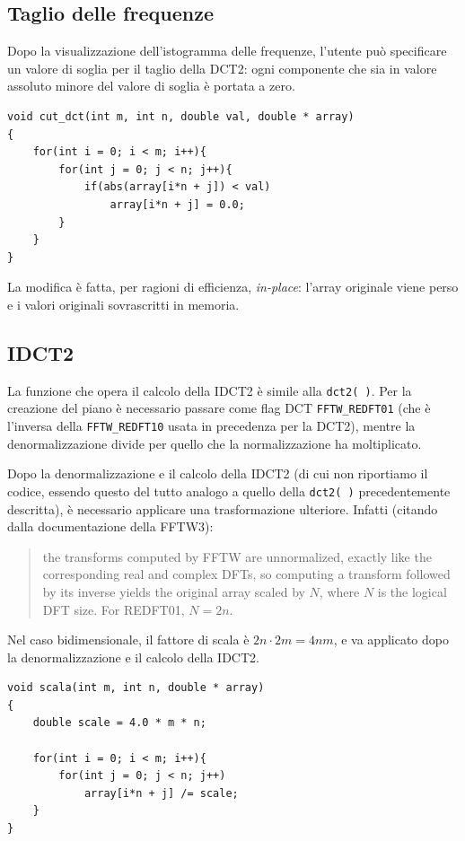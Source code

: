 \documentclass[11pt,a4paper]{scrartcl}
\begin{document}
\subsection*{Taglio delle frequenze}

Dopo la visualizzazione dell'istogramma delle frequenze, l'utente può specificare un valore di soglia per il taglio della DCT2: ogni componente che sia in valore assoluto minore del valore di soglia è portata a zero.


\begin{verbatim}
void cut_dct(int m, int n, double val, double * array)
{
    for(int i = 0; i < m; i++){
        for(int j = 0; j < n; j++){
            if(abs(array[i*n + j]) < val)
                array[i*n + j] = 0.0;
        }
    }
}
\end{verbatim}

La modifica è fatta, per ragioni di efficienza, \emph{in-place}: l'array originale viene perso e i valori originali sovrascritti in memoria.

\subsection*{IDCT2}

La funzione che opera il calcolo della IDCT2 è simile alla \texttt{dct2( )}. Per la creazione del piano è necessario passare come flag DCT \texttt{FFTW\_REDFT01} (che è l'inversa della \texttt{FFTW\_REDFT10} usata in precedenza per la DCT2), mentre la denormalizzazione divide per quello che la normalizzazione ha moltiplicato.

Dopo la denormalizzazione e il calcolo della IDCT2 (di cui non riportiamo il codice, essendo questo del tutto analogo a quello della \texttt{dct2( )} precedentemente descritta), è necessario applicare una trasformazione ulteriore. Infatti (citando dalla documentazione della FFTW3):
\begin{quotation}
the transforms computed by FFTW are unnormalized, exactly like the corresponding real and complex DFTs, so computing a transform followed by its inverse yields the original array scaled by $N$, where $N$ is the logical DFT size. For REDFT01, $N=2n$. 
\end{quotation}

Nel caso bidimensionale, il fattore di scala è $2n \cdot 2m = 4nm$, e va applicato dopo la denormalizzazione e  il calcolo della IDCT2.

\begin{verbatim}
void scala(int m, int n, double * array)
{
    double scale = 4.0 * m * n;

    for(int i = 0; i < m; i++){
        for(int j = 0; j < n; j++)
            array[i*n + j] /= scale;
    }
}
\end{verbatim}
\end{document}
